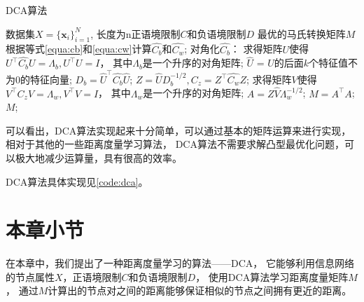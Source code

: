 \begin{algorithm}[htb]
    \caption{DCA算法}
    \label{algo:dca}
    \begin{algorithmic}[1]
        \Require
        数据集$X = \{ \bm{x}_i \}_{i=1}^{N}$,
        长度为n正语境限制$C$和负语境限制$D$        
        \Ensure
        最优的马氏转换矩阵$M$
        \State 根据等式\ref{equa:cb}和\ref{equa:cw}计算$\hat{C_b}$和$\hat{C_w}$;
        \State 对角化$\hat{C_b}$： 
        \State 求得矩阵$U$使得$U^\top \hat{C_b} U = \Lambda_b, U^\top U = I$，
            其中$\Lambda_b$是一个升序的对角矩阵;
        \State $\hat{U}$ = $U$的后面$k$个特征值不为$0$的特征向量;
        \State $D_b = \hat{U}^\top\hat{C_b}\hat{U}$;
        \State $Z = \hat{U}D_b^{-1/2}, C_z = Z^\top\hat{C_w}Z$;
        \State 求得矩阵$V$使得$V^\top C_z V = \Lambda_w, V^\top V = I$，
                其中$\Lambda_w$是一个升序的对角矩阵;
        \State $A = Z\hat{V}\Lambda_w^{-1/2}$; 
        \State $M = A^\top A$; 
        \Return $M$;
    \end{algorithmic}
\end{algorithm}

可以看出，DCA算法实现起来十分简单，可以通过基本的矩阵运算来进行实现，
相对于其他的一些距离度量学习算法，
DCA算法不需要求解凸型最优化问题，可以极大地减少运算量，具有很高的效率。

DCA算法具体实现见\ref{code:dca}。

\section{本章小节}

在本章中，我们提出了一种距离度量学习的算法——DCA，
它能够利用信息网络的节点属性$X$，正语境限制$C$和负语境限制$D$，
使用DCA算法学习距离度量矩阵$M$，
通过$M$计算出的节点对之间的距离能够保证相似的节点之间拥有更近的距离。
